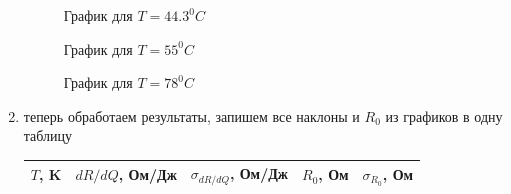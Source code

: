\documentclass[a4paper, 12pt]{article}%
\begin{document}
\begin{enumerate}
\begin{figure}[h]
\caption{График для $T = 44.3 ^0 C$}
\end{figure}
\FloatBarrier
\FloatBarrier
\begin{figure}[h]
\caption{График для $T = 55 ^0 C$}
\end{figure}
\FloatBarrier
\FloatBarrier
\begin{figure}[h]
\caption{График для $T = 78 ^0 C$}
\end{figure}
\FloatBarrier
\FloatBarrier
\item теперь обработаем результаты, запишем все наклоны и $R_0$ из графиков в одну таблицу
\begin{table}[h]
\begin{tabular}{|c|c|c|c|c|}
\hline
$T$, K & $dR/dQ$, Ом/Дж & $\sigma_{dR/dQ}$,  Ом/Дж & $R_0$, Ом & $\sigma_{R_0}$, Ом \\ \hline

\end{tabular}
\end{table}
\end{enumerate}
\end{document}
